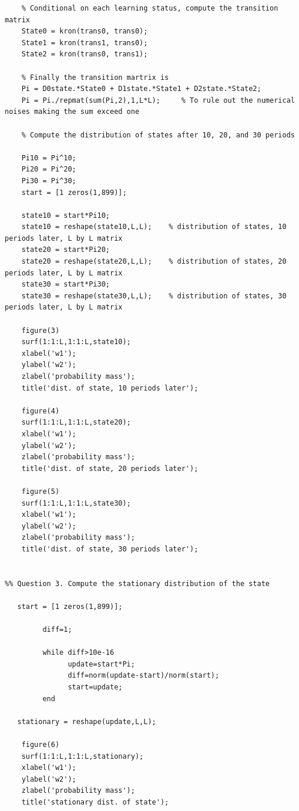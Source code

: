 \documentclass[10pt, letterpaper]{article}
\begin{document}
\begin{verbatim}
    % Conditional on each learning status, compute the transition matrix
    State0 = kron(trans0, trans0);
    State1 = kron(trans1, trans0);
    State2 = kron(trans0, trans1);
    
    % Finally the transition martrix is
    Pi = D0state.*State0 + D1state.*State1 + D2state.*State2;
    Pi = Pi./repmat(sum(Pi,2),1,L*L);     % To rule out the numerical noises making the sum exceed one
    
    % Compute the distribution of states after 10, 20, and 30 periods
    
    Pi10 = Pi^10;
    Pi20 = Pi^20;
    Pi30 = Pi^30;
    start = [1 zeros(1,899)];
   
    state10 = start*Pi10;
    state10 = reshape(state10,L,L);    % distribution of states, 10 periods later, L by L matrix
    state20 = start*Pi20;
    state20 = reshape(state20,L,L);    % distribution of states, 20 periods later, L by L matrix
    state30 = start*Pi30;
    state30 = reshape(state30,L,L);    % distribution of states, 30 periods later, L by L matrix
    
    figure(3)
    surf(1:1:L,1:1:L,state10);
    xlabel('w1');
    ylabel('w2');
    zlabel('probability mass');
    title('dist. of state, 10 periods later');
    
    figure(4)
    surf(1:1:L,1:1:L,state20);
    xlabel('w1');
    ylabel('w2');
    zlabel('probability mass');    
    title('dist. of state, 20 periods later');

    figure(5)
    surf(1:1:L,1:1:L,state30);
    xlabel('w1');
    ylabel('w2');
    zlabel('probability mass'); 
    title('dist. of state, 30 periods later');

    
%% Question 3. Compute the stationary distribution of the state

   start = [1 zeros(1,899)];

         diff=1;

         while diff>10e-16
               update=start*Pi;
               diff=norm(update-start)/norm(start);
               start=update;
         end
     
   stationary = reshape(update,L,L);
   
    figure(6)
    surf(1:1:L,1:1:L,stationary);
    xlabel('w1');
    ylabel('w2');
    zlabel('probability mass');
    title('stationary dist. of state');

\end{verbatim}
                     
\end{document}
